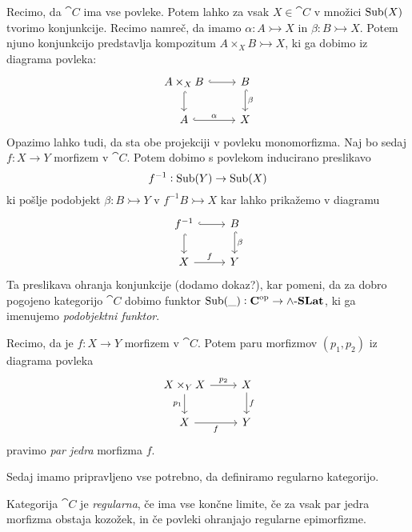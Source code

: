 \documentclass[../kategoricna_logika.tex]{subfiles}
\begin{document}
Recimo, da $\cat{C}$ ima vse povleke. Potem lahko za vsak $X \in \cat{C}$ v množici $\operatorname{Sub}(X)$ tvorimo konjunkcije. Recimo namreč, da imamo $\alpha : A \rightarrowtail X$ in $\beta : B \rightarrowtail X$. Potem njuno konjunkcijo predstavlja kompozitum $A \times_X B \rightarrowtail X$, ki ga dobimo iz diagrama povleka:
\begin{equation*}
    \begin{tikzcd}
        A \times_X B \ar[r, hook] \ar[d, hook] & B \ar[d, hook, "\beta"] \\
        A \ar[r, hook, "\alpha"] & X
    \end{tikzcd}
\end{equation*}
Opazimo lahko tudi, da sta obe projekciji v povleku monomorfizma. Naj bo sedaj $f : X \to Y$ morfizem v $\cat{C}$. Potem dobimo s povlekom inducirano preslikavo
$$f^{-1} : \operatorname{Sub}(Y) \to \operatorname{Sub}(X)$$
ki pošlje podobjekt $\beta : B \rightarrowtail Y$ v $f^{-1}B \rightarrowtail X$ kar lahko prikažemo v diagramu
\begin{equation*}
    \begin{tikzcd}
        f^{-1} \ar[r, hook] \ar[d, hook] & B \ar[d, hook, "\beta"] \\
        X \ar[r, "f"] & Y
    \end{tikzcd}
\end{equation*}
Ta preslikava ohranja konjunkcije (dodamo dokaz?), kar pomeni, da za dobro pogojeno kategorijo $\cat{C}$ dobimo funktor $\operatorname{Sub}(\_) : {\operatorname{\mathbf{C}}}^{\mathrm{op}} \to {\operatorname{\mathbf{\wedge-\mathbf{SLat}}}}$, ki ga imenujemo \emph{podobjektni funktor}.
\begin{definicija}
    Recimo, da je $f : X \to Y$ morfizem v $\cat{C}$. Potem paru morfizmov $(p_1, p_2)$ iz diagrama povleka
    \begin{equation*}
        \begin{tikzcd}
        X \times_Y X \ar[d, "p_1"'] \ar[r, "p_2"] & X \ar[d, "f"] \\
        X \ar[r, "f"'] & Y
        \end{tikzcd}
    \end{equation*}
    pravimo \emph{par jedra} morfizma $f$.
\end{definicija}
Sedaj imamo pripravljeno vse potrebno, da definiramo regularno kategorijo.
\begin{definicija}
    Kategorija $\cat{C}$ je \emph{regularna}, če ima vse končne limite, če za vsak par jedra morfizma obstaja kozožek, in če povleki ohranjajo regularne epimorfizme.
\end{definicija}
\end{document}
